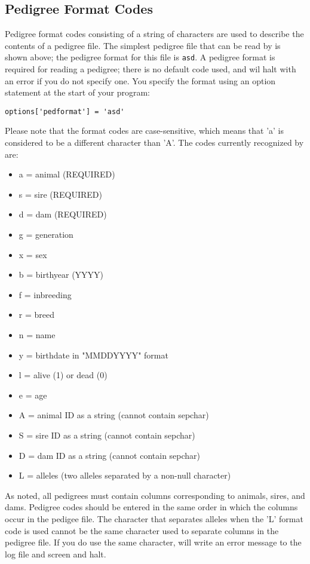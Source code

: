 \subsection{Pedigree Format Codes}
\label{sec:pedigree-format-codes}
Pedigree format codes consisting of a string of characters are used to describe
the contents of a pedigree file.  The simplest pedigree file that can be read by \PyPedal{}
is shown above; the pedigree format for this file is \texttt{asd}.  A pedigree format is required
for reading a pedigree; there is no default code used, and \PyPedal{} wil halt with an error if you
do not specify one.  You specify the format using an option statement at the start of your program:
\begin{verbatim}
options['pedformat'] = 'asd'
\end{verbatim}
Please note that the format codes are case-sensitive, which means that 'a' is considered to be a different character than 'A'.  The codes currently recognized by \PyPedal{} are:
\begin{itemize}
\item a = animal (REQUIRED)
\item s = sire (REQUIRED)
\item d = dam (REQUIRED)
\item g = generation
\item x = sex
\item b = birthyear (YYYY)
\item f = inbreeding
\item r = breed
\item n = name
\item y = birthdate in "MMDDYYYY" format
\item l = alive (1) or dead (0)
\item e = age
\item A = animal ID as a string (cannot contain sepchar)
\item S = sire ID as a string (cannot contain sepchar)
\item D = dam ID as a string (cannot contain sepchar)
\item L = alleles (two alleles separated by a non-null character)
\end{itemize}
As noted, all pedigrees must contain columns corresponding to animals, sires, and dams.  Pedigree codes should be entered in the same order in which the columns occur in the pedigee file.  The character that separates alleles when the 'L' format code is used cannot be the same character used to separate columns in the pedigree file.  If you do use the same character, \PyPedal{} will write an error message to the log file and screen and halt.

